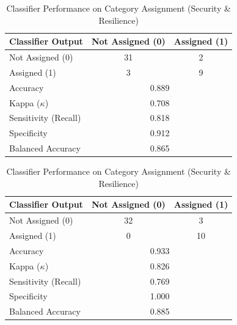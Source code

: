 \begin{table}[h!]
\begin{minipage}{0.48\textwidth}
\centering
\caption{Classifier Performance on Category Assignment (Bias \& Inequity)}
\label{tab:cm-bias-inequity}
\begin{tabular}{lcc}
\hline
\textbf{Classifier Output} & \textbf{Not Assigned (0)} & \textbf{Assigned (1)} \\
\hline
Not Assigned (0) & 31 & 2 \\
Assigned (1) & 3 & 9 \\
\hline
Accuracy & \multicolumn{2}{c}{0.889} \\
Kappa ($\kappa$) & \multicolumn{2}{c}{0.708} \\
Sensitivity (Recall) & \multicolumn{2}{c}{0.818} \\
Specificity & \multicolumn{2}{c}{0.912} \\
Balanced Accuracy & \multicolumn{2}{c}{0.865} \\
\hline
\end{tabular}
\end{minipage}
\hfill
\hfill
\begin{minipage}{0.48\textwidth}
\centering
\caption{Classifier Performance on Category Assignment (Security \& Resilience)}
\label{tab:cm-security-resilience}
\begin{tabular}{lcc}
\hline
\textbf{Classifier Output} & \textbf{Not Assigned (0)} & \textbf{Assigned (1)} \\
\hline
Not Assigned (0) & 32 & 3 \\
Assigned (1) & 0 & 10 \\
\hline
Accuracy & \multicolumn{2}{c}{0.933} \\
Kappa ($\kappa$) & \multicolumn{2}{c}{0.826} \\
Sensitivity (Recall) & \multicolumn{2}{c}{0.769} \\
Specificity & \multicolumn{2}{c}{1.000} \\
Balanced Accuracy & \multicolumn{2}{c}{0.885} \\
\hline
\end{tabular}
\end{minipage}
\end{table}

